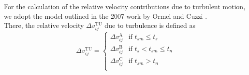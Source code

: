         For the calculation of the relative velocity contributions due to turbulent motion, we 
        adopt the model outlined in the 2007 work by Ormel and Cuzzi \cite{ormel_cuzzi_2007}. \\

        There, the relative velocity $\Delta v^\text{TU}_{ij}$ due to turbulence is defined as
        \begin{equation}
            \Delta v^\text{TU}_{ij} =
            \begin{cases}
                \Delta v_{ij}^\text{A} & \text{if } t_{sm} \leq t_s \\
                \Delta v_{ij}^\text{B} & \text{if } t_s < t_{sm} \leq t_n \\
                \Delta v_{ij}^\text{C} & \text{if } t_{sm} > t_n \\
            \end{cases}
        \end{equation}

